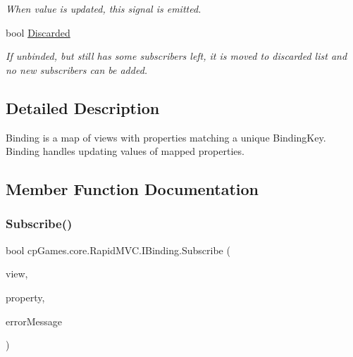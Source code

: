 \begin{DoxyCompactItemize}
\begin{DoxyCompactList}\small\item\em When value is updated, this signal is emitted. \end{DoxyCompactList}\item 
bool \mbox{\hyperlink{interfacecp_games_1_1core_1_1_rapid_m_v_c_1_1_i_binding_ae17bd243bf029b3d59f58d48c582737d}{Discarded}}
\begin{DoxyCompactList}\small\item\em If unbinded, but still has some subscribers left, it is moved to discarded list and no new subscribers can be added. \end{DoxyCompactList}\end{DoxyCompactItemize}


\subsection{Detailed Description}
Binding is a map of views with properties matching a unique Binding\+Key. Binding handles updating values of mapped properties. 



\subsection{Member Function Documentation}
\mbox{\label{interfacecp_games_1_1core_1_1_rapid_m_v_c_1_1_i_binding_a6137a570057c5f4cce62ac96d1bb83e2}} 
\subsubsection{\texorpdfstring{Subscribe()}{Subscribe()}}
{\footnotesize\ttfamily bool cp\+Games.\+core.\+Rapid\+M\+V\+C.\+I\+Binding.\+Subscribe (\begin{DoxyParamCaption}\item[{\mbox{\hyperlink{interfacecp_games_1_1core_1_1_rapid_m_v_c_1_1_i_view}{I\+View}}}]{view,  }\item[{Property\+Info}]{property,  }\item[{out string}]{error\+Message }\end{DoxyParamCaption})}



